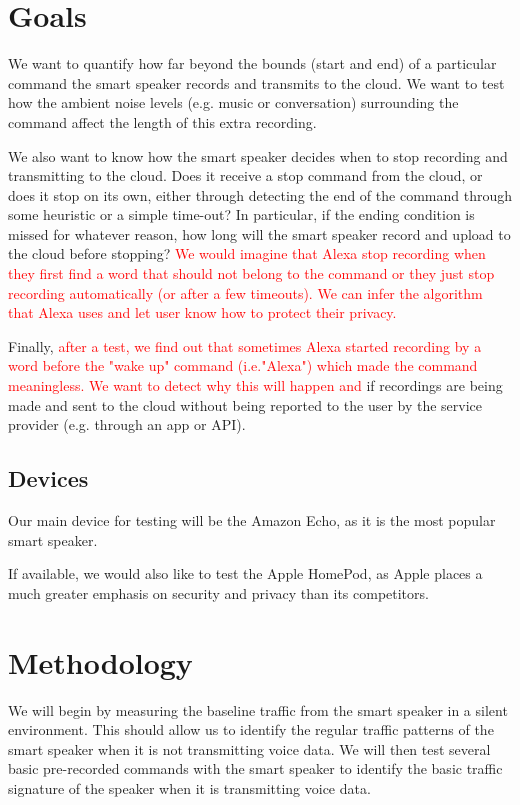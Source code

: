 \section{Goals}

We want to quantify how far beyond the bounds (start and end) of a particular command the smart speaker records and transmits to the cloud. We want to test how the ambient noise levels (e.g. music or conversation) surrounding the command affect the length of this extra recording.

We also want to know how the smart speaker decides when to stop recording and transmitting to the cloud. Does it receive a stop command from the cloud, or does it stop on its own, either through detecting the end of the command through some heuristic or a simple time-out? In particular, if the ending condition is missed for whatever reason, how long will the smart speaker record and upload to the cloud before stopping? \textcolor{red}{We would imagine that Alexa stop recording when they first find a word that should not belong to the command or they just stop recording automatically (or after a few timeouts). We can infer the algorithm that Alexa uses and let user know how to protect their privacy.}

Finally, \textcolor{red}{after a test, we find out that sometimes Alexa started recording by a word before the "wake up" command (i.e."Alexa") which made the command meaningless. We want to detect why this will happen and} if recordings are being made and sent to the cloud without being reported to the user by the service provider (e.g. through an app or API).

\subsection{Devices}
Our main device for testing will be the Amazon Echo, as it is the most popular smart speaker.

If available, we would also like to test the Apple HomePod, as Apple places a much greater emphasis on security and privacy than its competitors.

\section{Methodology}

We will begin by measuring the baseline traffic from the smart speaker in a silent environment. This should allow us to identify the regular traffic patterns of the smart speaker when it is not transmitting voice data. We will then test several basic pre-recorded commands with the smart speaker to identify the basic traffic signature of the speaker when it is transmitting voice data.

